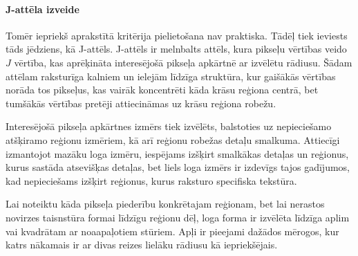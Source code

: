 \documentclass[12pt,paper=a4]{report}
\begin{document}
\paragraph{J-attēla izveide}Tomēr iepriekš aprakstītā kritērija pielietošana nav praktiska. Tādēļ tiek ieviests tāds jēdziens, kā J-attēls. J-attēls ir melnbalts attēls, kura pikseļu vērtības veido $J$ vērtība, kas aprēķināta interesējošā pikseļa apkārtnē ar izvēlētu rādiusu. Šādam attēlam raksturīga kalniem un ielejām līdzīga struktūra, kur gaišākās vērtības norāda tos pikseļus, kas vairāk koncentrēti kāda krāsu reģiona centrā, bet tumšākās vērtības pretēji attiecināmas uz krāsu reģiona robežu.\cite{2unsupImSegm2001}\par
Interesējošā pikseļa apkārtnes izmērs tiek izvēlēts, balstoties uz nepieciešamo atšķiramo reģionu izmēriem, kā arī reģionu robežas detaļu smalkuma. Attiecīgi izmantojot mazāku loga izmēru, iespējams izšķirt smalkākas detaļas un reģionus, kurus sastāda atsevišķas detaļas, bet liels loga izmērs ir izdevīgs tajos gadījumos, kad nepieciešams izšķirt reģionus, kurus raksturo specifiska tekstūra. \cite{1colImSegm1999}\par
Lai noteiktu kāda pikseļa piederību konkrētajam reģionam, bet lai nerastos novirzes taisnstūra formai līdzīgu reģionu dēļ, loga forma ir izvēlēta līdzīga aplim vai kvadrātam ar noaapaļotiem stūriem. Apļi ir pieejami dažādos mērogos, kur katrs nākamais ir ar divas reizes lielāku rādiusu kā iepriekšējais. \cite{1colImSegm1999}\par
\end{document}
